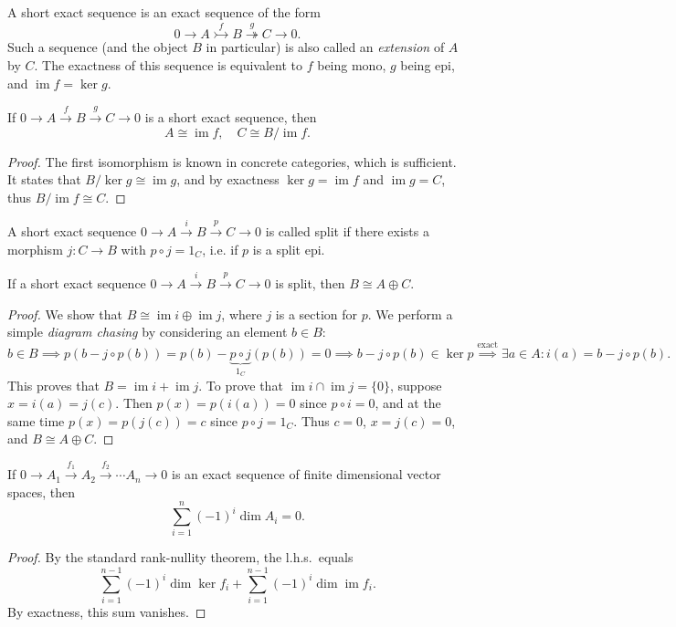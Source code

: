 \documentclass[english,letterpaper]{article}%
\numberwithin{equation}{section}
\numberwithin{figure}{section}
\numberwithin{table}{section}
\theoremstyle{definition}
\theoremstyle{definition}
\theoremstyle{definition}
\theoremstyle{plain}
\theoremstyle{plain}
\theoremstyle{plain}
\theoremstyle{plain}
\theoremstyle{remark}
\theoremstyle{remark}
\DeclareMathOperator{\im}{im}
\begin{document}
\begin{defn}
 A short exact sequence is an exact sequence of the form
 \[0\to A\overset f\rightarrowtail B\overset g \twoheadrightarrow C\to 0.\]
 Such a sequence (and the object $B$ in particular) is also called an \emph{extension} of $A$ by $C$. The exactness of this sequence is equivalent to $f$ being mono, $g$ being epi, and $\im f=\ker g$.
\end{defn}

\begin{prop}
    If $0\to A\overset f\to B\overset g \to C\to 0$ is a short exact sequence, then 
    \[A\cong \im f,\quad C\cong B/\im f.\]
\end{prop}
\begin{proof}
    The first isomorphism is known in concrete categories, which is sufficient. It states that $B/\ker g\cong \im g$, and by exactness $\ker g=\im f$ and $\im g=C$, thus $B/\im f\cong C$.
\end{proof}

\begin{defn}
 A short exact sequence $0\to A\overset i\to B\overset p \to C\to 0$ is called split if there exists a morphism $j:C\to B$ with $p\circ j=1_C$, i.e. if $p$ is a split epi.
\end{defn}

\begin{prop}
    If a short exact sequence $0\to A\overset i\to B\overset p \to C\to 0$ is split, then $B\cong A\oplus C$.
\end{prop}
\begin{proof}
    We show that $B\cong \im i\oplus \im j$, where $j$ is a section for $p$. We perform a simple \emph{diagram chasing} by considering an element $b\in B$:
    \[b\in B\implies p(b-j\circ p(b))=p(b)-\underbrace{p\circ j}_{1_C}(p(b))=0\implies b-j\circ p(b)\in\ker p\overset{\text{exact}}{\implies}\exists a\in A: i(a)=b-j\circ p(b).\]
    This proves that $B=\im i+\im j$. To prove that $\im i\cap \im j=\{0\}$, suppose $x=i(a)=j(c)$. Then $p(x)=p(i(a))=0$ since $p\circ i=0$, and at the same time $p(x)=p(j(c))=c$ since $p\circ j=1_C$. Thus $c=0$, $x=j(c)=0$, and $B\cong A\oplus C$.
\end{proof}

\begin{prop}\label{gen rank-nullity}
    If $0\to A_1\overset{f_1}\to A_2 \overset{f_2}\to\cdots A_n\to 0$ is an exact sequence of finite dimensional vector spaces, then
    \[\sum_{i=1}^n(-1)^i \dim A_i=0.\]
\end{prop}
\begin{proof}
    By the standard rank-nullity theorem, the l.h.s.\ equals \[\sum_{i=1}^{n-1}(-1)^i\dim \ker f_i+\sum_{i=1}^{n-1}(-1)^i\dim \im f_i.\] By exactness, this sum vanishes.
\end{proof}
\end{document}
